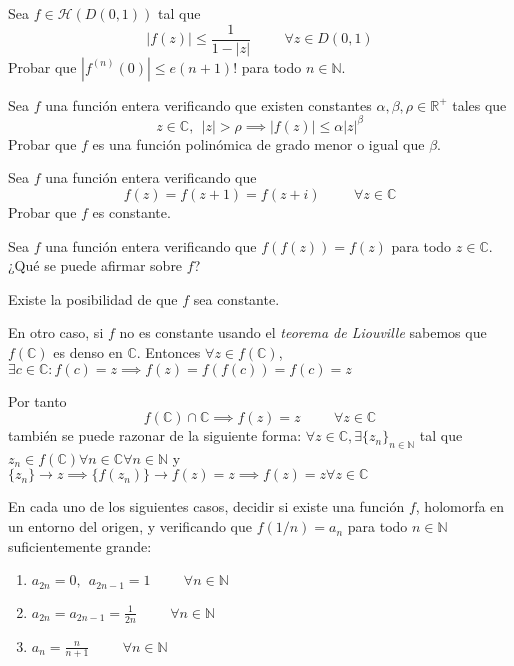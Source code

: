 \begin{ejer}
	Sea $f\in\mathcal{H}(D(0,1))$ tal que
	$$ |f(z)| \leq \frac{1}{1-|z|} \hspace{1cm} \forall z\in D(0,1) $$
	Probar que $|f^{(n)}(0)| \leq e(n+1)!$ para todo $n\in\mathbb{N}$.
\end{ejer}

\begin{ejer}
	Sea $f$ una función entera verificando que existen constantes $\alpha,\beta,\rho\in\mathbb{R}^+$ tales que
	$$ z\in\mathbb{C}, \ \ |z|>\rho \implies |f(z)| \leq \alpha |z|^{\beta} $$
	Probar que $f$ es una función polinómica de grado menor o igual que $\beta$.
\end{ejer}

\begin{ejer}
	Sea $f$ una función entera verificando que
	$$ f(z) = f(z+1)=f(z+i) \hspace{1cm} \forall z\in\mathbb{C} $$
	Probar que $f$ es constante.
\end{ejer}

\begin{ejer}
	Sea $f$ una función entera verificando que $f(f(z))=f(z)$ para todo $z\in\mathbb{C}$. ¿Qué se puede afirmar sobre $f$?
\end{ejer}
\begin{sol}
Existe la posibilidad de que $f$ sea constante.

En otro caso, si $f$ no es constante usando el \textit{teorema de Liouville} sabemos que $f(\mathbb{C})$ es denso en $\mathbb{C}$.
Entonces
$\forall z\in f(\mathbb{C})$, $\exists c\in\mathbb{C} : f(c)=z \implies f(z) = f(f(c)) = f(c) = z$


Por tanto
$$f(\mathbb{C}) \cap \mathbb{C} \implies f(z)=z \hspace{1cm}  \forall z\in \mathbb{C}$$
también se puede razonar de la siguiente forma:
$\forall z\in\mathbb{C}, \exists \{z_n\}_{n\in\mathbb{N}}$ tal que 
$z_n\in f(\mathbb{C}) \forall n\in\mathbb{C} \forall n\in\mathbb{N}$ y $\{z_n\}\rightarrow z \implies \{f(z_n)\}\rightarrow f(z)=z \implies f(z)=z \forall z\in\mathbb{C}$
\end{sol}

\begin{ejer}
	En cada uno de los siguientes casos, decidir si existe una función $f$, holomorfa en un entorno del origen, y verificando que $f(1/n)=a_n$ para todo $n\in\mathbb{N}$ suficientemente grande:
	\begin{enumerate}[label=(\alph*)]
		\item $a_{2n} = 0, \ \ a_{2n-1}=1 \hspace{1cm} \forall n\in\mathbb{N}$
		\item $a_{2n} = a_{2n-1} = \frac{1}{2n} \hspace{1cm} \forall n\in\mathbb{N}$
		\item $a_n = \frac{n}{n+1} \hspace{1cm} \forall n\in\mathbb{N}$
	\end{enumerate}
\end{ejer}

